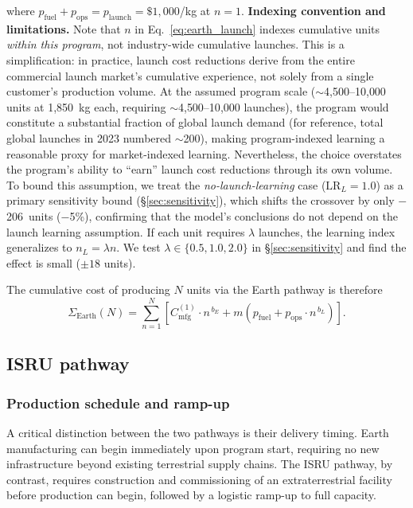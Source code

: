 \documentclass[preprint,12pt]{elsarticle}
\begin{document}
where $p_{\mathrm{fuel}} + p_{\mathrm{ops}} = p_{\mathrm{launch}} = \$1{,}000$/kg at $n = 1$. \textbf{Indexing convention and limitations.} Note that $n$ in Eq.~\ref{eq:earth_launch} indexes cumulative units \emph{within this program}, not industry-wide cumulative launches. This is a simplification: in practice, launch cost reductions derive from the entire commercial launch market's cumulative experience, not solely from a single customer's production volume. At the assumed program scale ($\sim$4{,}500--10{,}000 units at 1{,}850~kg each, requiring $\sim$4{,}500--10{,}000 launches), the program would constitute a substantial fraction of global launch demand (for reference, total global launches in 2023 numbered $\sim$200), making program-indexed learning a reasonable proxy for market-indexed learning. Nevertheless, the choice overstates the program's ability to ``earn'' launch cost reductions through its own volume. To bound this assumption, we treat the \emph{no-launch-learning} case ($\mathrm{LR}_L = 1.0$) as a primary sensitivity bound (\S\ref{sec:sensitivity}), which shifts the crossover by only $-$206~units ($-$5\%), confirming that the model's conclusions do not depend on the launch learning assumption. If each unit requires $\lambda$ launches, the learning index generalizes to $n_L = \lambda n$. We test $\lambda \in \{0.5, 1.0, 2.0\}$ in \S\ref{sec:sensitivity} and find the effect is small ($\pm 18$ units).

The cumulative cost of producing $N$ units via the Earth pathway is therefore
\begin{equation}
  \Sigma_{\mathrm{Earth}}(N) = \sum_{n=1}^{N} \left[ C_{\mathrm{mfg}}^{(1)} \cdot n^{\,b_E} + m \left( p_{\mathrm{fuel}} + p_{\mathrm{ops}} \cdot n^{\,b_L} \right) \right].
  \label{eq:earth_cum}
\end{equation}

\subsection{ISRU pathway}

\subsubsection{Production schedule and ramp-up}

A critical distinction between the two pathways is their delivery timing. Earth manufacturing can begin immediately upon program start, requiring no new infrastructure beyond existing terrestrial supply chains. The ISRU pathway, by contrast, requires construction and commissioning of an extraterrestrial facility before production can begin, followed by a logistic ramp-up to full capacity.
\end{document}
